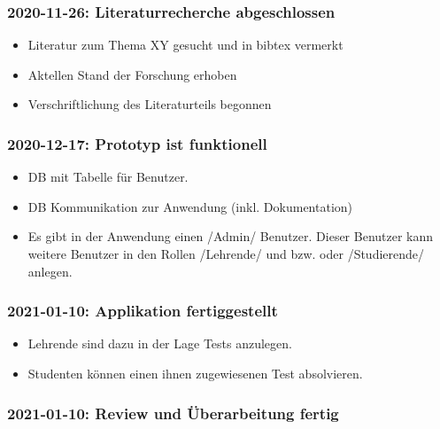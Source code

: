 \documentclass[
    headings=optiontotocandhead,%
    twoside,
    numbers=noenddot,%
    12pt, %
    titlepage, %
    parskip=full, %
    listof=leveldown, 
    numbers=noenddot, %
    a4paper,DIV=14,
    BCOR=15mm,
]{scrbook}
\providecommand{\tightlist}{%
  \setlength{\itemsep}{0pt}\setlength{\parskip}{0pt}}
\begin{document}
\hypertarget{literaturrecherche-abgeschlossen}{%
\subsubsection{2020-11-26: Literaturrecherche
abgeschlossen}\label{literaturrecherche-abgeschlossen}}

\begin{itemize}
\tightlist
\item
  Literatur zum Thema XY gesucht und in bibtex vermerkt
\item
  Aktellen Stand der Forschung erhoben
\item
  Verschriftlichung des Literaturteils begonnen
\end{itemize}

\hypertarget{prototyp-ist-funktionell}{%
\subsubsection{2020-12-17: Prototyp ist
funktionell}\label{prototyp-ist-funktionell}}

\begin{itemize}
\tightlist
\item
  DB mit Tabelle für Benutzer.
\item
  DB Kommunikation zur Anwendung (inkl. Dokumentation)
\item
  Es gibt in der Anwendung einen /Admin/ Benutzer. Dieser Benutzer kann
  weitere Benutzer in den Rollen /Lehrende/ und bzw. oder /Studierende/
  anlegen.
\end{itemize}

\hypertarget{applikation-fertiggestellt}{%
\subsubsection{2021-01-10: Applikation
fertiggestellt}\label{applikation-fertiggestellt}}

\begin{itemize}
\tightlist
\item
  Lehrende sind dazu in der Lage Tests anzulegen.
\item
  Studenten können einen ihnen zugewiesenen Test absolvieren.
\end{itemize}

\hypertarget{review-und-uxfcberarbeitung-fertig}{%
\subsubsection{2021-01-10: Review und Überarbeitung
fertig}\label{review-und-uxfcberarbeitung-fertig}}
\end{document}
